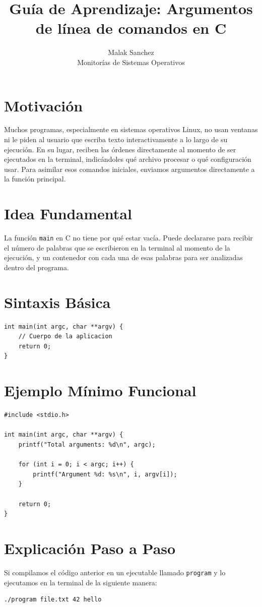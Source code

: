 \documentclass[12pt,a4paper]{article}
\title{\textbf{Guía de Aprendizaje: Argumentos de línea de comandos en C}}
\author{Malak Sanchez \\ \small Monitorías de Sistemas Operativos}
\date{}
\begin{document}
\maketitle

\section{Motivación}
Muchos programas, especialmente en sistemas operativos Linux, no usan ventanas ni le piden al usuario que escriba texto interactivamente a lo largo de su ejecución. En su lugar, reciben las órdenes directamente al momento de ser ejecutados en la terminal, indicándoles qué archivo procesar o qué configuración usar. Para asimilar esos comandos iniciales, enviamos argumentos directamente a la función principal.

\section{Idea Fundamental}
La función \texttt{main} en C no tiene por qué estar vacía. Puede declararse para recibir el número de palabras que se escribieron en la terminal al momento de la ejecución, y un contenedor con cada una de esas palabras para ser analizadas dentro del programa.

\section{Sintaxis Básica}
\begin{lstlisting}[numbers=none]
int main(int argc, char **argv) {
    // Cuerpo de la aplicacion
    return 0;
}
\end{lstlisting}

\section{Ejemplo Mínimo Funcional}
\begin{lstlisting}
#include <stdio.h>

int main(int argc, char **argv) {
    printf("Total arguments: %d\n", argc);
    
    for (int i = 0; i < argc; i++) {
        printf("Argument %d: %s\n", i, argv[i]);
    }
    
    return 0;
}
\end{lstlisting}

\section{Explicación Paso a Paso}
Si compilamos el código anterior en un ejecutable llamado \texttt{program} y lo ejecutamos en la terminal de la siguiente manera:
\begin{lstlisting}[numbers=none]
./program file.txt 42 hello
\end{lstlisting}
\end{document}

